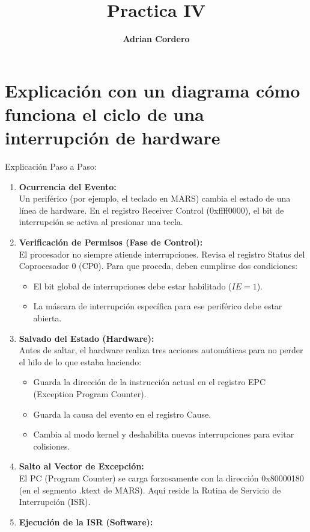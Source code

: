\documentclass[]{article}
\title{\textbf{{\Huge Practica IV}}}
\author{\textbf{{\LARGE Adrian Cordero}}}
\begin{document}
\maketitle
\newpage

\section{Explicación con un diagrama cómo funciona el ciclo de una interrupción de hardware}
	Explicación Paso a Paso:
	\begin{enumerate}
		\item \textbf{Ocurrencia del Evento:}\\
			Un periférico (por ejemplo, el teclado en MARS) cambia el estado de una línea de hardware. En el registro Receiver Control (0xffff0000), el bit de interrupción se activa al presionar una tecla.
		\item \textbf{Verificación de Permisos (Fase de Control):}\\
			El procesador no siempre atiende interrupciones. Revisa el registro Status del Coprocesador 0 (CP0). Para que proceda, deben cumplirse dos condiciones:
			\begin{itemize}
				\item El bit global de interrupciones debe estar habilitado ($IE = 1$).
				\item La máscara de interrupción específica para ese periférico debe estar abierta.
			\end{itemize}
		\item \textbf{Salvado del Estado (Hardware):}\\
			Antes de saltar, el hardware realiza tres acciones automáticas para no perder el hilo de lo que estaba haciendo:
			\begin{itemize}
				\item Guarda la dirección de la instrucción actual en el registro EPC (Exception Program Counter).
				\item Guarda la causa del evento en el registro Cause.
				\item Cambia al modo kernel y deshabilita nuevas interrupciones para evitar colisiones.
			\end{itemize}
		\item \textbf{Salto al Vector de Excepción:}\\
			El PC (Program Counter) se carga forzosamente con la dirección 0x80000180 (en el segmento .ktext de MARS). Aquí reside la Rutina de Servicio de Interrupción (ISR).
		\item \textbf{Ejecución de la ISR (Software):}\\

\end{enumerate}
\end{document}
